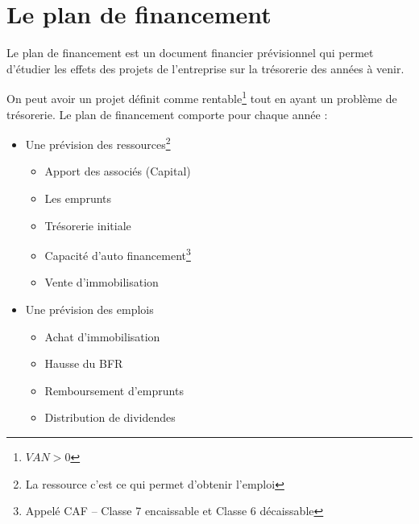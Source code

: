 	\section{Le plan de financement}
		Le plan de financement est un document financier prévisionnel qui permet d'étudier les effets des projets de l'entreprise sur la trésorerie des années à venir. 
		
		On peut avoir un projet définit comme rentable\footnote{$VAN > 0$} tout en ayant un problème de trésorerie. 
		Le plan de financement comporte pour chaque année : 
		\begin{itemize}
			\item Une prévision des ressources\footnote{La ressource c'est ce qui permet d'obtenir l'emploi}
				\begin{itemize}
					\item Apport des associés (Capital)
					\item Les emprunts
					\item Trésorerie initiale
					\item Capacité d'auto financement\footnote{Appelé CAF -- Classe 7 encaissable et Classe 6 décaissable}
					\item Vente d'immobilisation 
				\end{itemize}
			\item Une prévision des emplois
				\begin{itemize}
					\item Achat d'immobilisation
					\item Hausse du BFR
					\item Remboursement d'emprunts
					\item Distribution de dividendes
				\end{itemize}
		\end{itemize}
